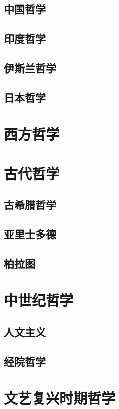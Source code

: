 \documentclass[UTF8]{../RepresentationUniverse}
\begin{document}
        \subsection{中国哲学}
        \subsection{印度哲学}
        \subsection{伊斯兰哲学}
        \subsection{日本哲学}


    \section{西方哲学}



    \section{古代哲学}
        \subsection{古希腊哲学}
        \subsection{亚里士多德}
        \subsection{柏拉图}

    \section{中世纪哲学}
    \subsection{人文主义}
    \subsection{经院哲学}

    \section{文艺复兴时期哲学}
\end{document}

